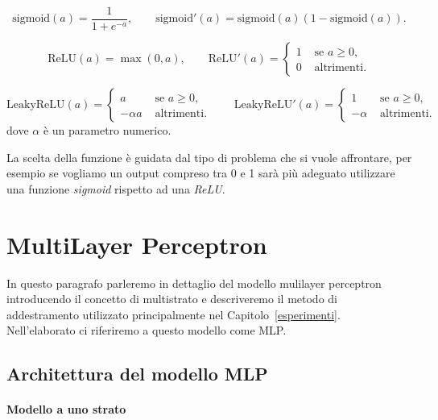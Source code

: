 \documentclass[11pt,a4paper,twoside,
openright]{book}
\begin{document}
\begin{equation}
\mathrm{sigmoid}(a) = \frac{1}{1+e^{-a}}, \qquad
\mathrm{sigmoid}'(a) = \mathrm{sigmoid}(a)(1-\mathrm{sigmoid}(a)).
\label{sigmoid}
\end{equation}

\begin{equation}
\mathrm{ReLU}(a) = \max(0,a), \qquad
\mathrm{ReLU}'(a) = \begin{cases}
1 &\text{ se } a\geq0, \\
0 &\text{ altrimenti}.
\end{cases}
\label{relu}
\end{equation}

\begin{equation}
\mathrm{LeakyReLU}(a) = \begin{cases}
a &\text{ se } a\geq0, \\
- \alpha a &\text{ altrimenti}.
\end{cases} \qquad
\mathrm{LeakyReLU}'(a) = \begin{cases}
1 &\text{ se } a\geq0, \\
-\alpha &\text{ altrimenti}.
\end{cases}
\label{lrelu}
\end{equation}
dove $\alpha$ è un parametro numerico.

La scelta della funzione è guidata dal tipo di problema che si vuole affrontare, per esempio se vogliamo un output compreso tra 0 e 1 sarà più adeguato utilizzare una funzione \textit{sigmoid} rispetto ad una \textit{ReLU}.



\section{MultiLayer Perceptron}
In questo paragrafo parleremo in dettaglio del modello mulilayer perceptron introducendo il concetto di multistrato e descriveremo il metodo di addestramento utilizzato principalmente nel Capitolo~\ref{esperimenti}. Nell’elaborato ci riferiremo a questo modello come MLP.
\subsection{Architettura del modello MLP}
\label{archmlp}
\paragraph{Modello a uno strato}
\def\layersep{2.5cm}
\end{document}
